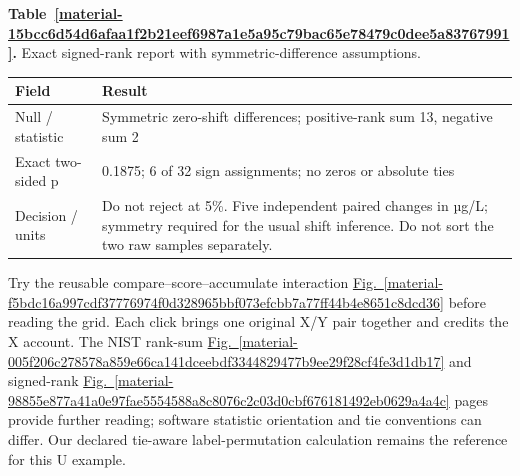 \documentclass[11pt,a4paper]{article}
\newcounter{scripttable}
\begin{document}
\medskip

\par\medskip
{}
\label{material-15bcc6d54d6afaa1f2b21eef6987a1e5a95c79bac65e78479c0dee5a83767991}
\noindent\textbf{Table~\ref*{material-15bcc6d54d6afaa1f2b21eef6987a1e5a95c79bac65e78479c0dee5a83767991}.} Exact signed-rank report with symmetric-difference assumptions.\par\nopagebreak
\begin{longtable}{@{}p{}p{}@{}}
Field & Result \\ \hline
\endhead
Null / statistic & Symmetric zero-shift differences; positive-rank sum 13, negative sum 2 \\ \hline
Exact two-sided p & 0.1875; 6 of 32 sign assignments; no zeros or absolute ties \\ \hline
Decision / units & Do not reject at 5\%. Five independent paired changes in µg/L; symmetry required for the usual shift inference. Do not sort the two raw samples separately. \\ \hline
\end{longtable}
\medskip

Try the reusable compare–score–accumulate interaction \hyperref[material-f5bdc16a997cdf37776974f0d328965bbf073efcbb7a77ff44b4e8651c8dcd36]{Fig.~\ref*{material-f5bdc16a997cdf37776974f0d328965bbf073efcbb7a77ff44b4e8651c8dcd36}} before reading the grid. Each click brings one original X/Y pair together and credits the X account. The NIST rank-sum \hyperref[material-005f206c278578a859e66ca141dceebdf3344829477b9ee29f28cf4fe3d1db17]{Fig.~\ref*{material-005f206c278578a859e66ca141dceebdf3344829477b9ee29f28cf4fe3d1db17}} and signed-rank \hyperref[material-98855e877a41a0e97fae5554588a8c8076c2c03d0cbf676181492eb0629a4a4c]{Fig.~\ref*{material-98855e877a41a0e97fae5554588a8c8076c2c03d0cbf676181492eb0629a4a4c}} pages provide further reading; software statistic orientation and tie conventions can differ. Our declared tie-aware label-permutation calculation remains the reference for this U example.
\end{document}
